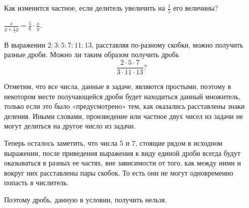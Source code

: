 
\begin{itemize}

	\itA Как изменится частное, если делитель увеличить на $\tfrac{1}{5}$ его величины?
	
	\itr $\frac{x}{y + \frac{1}{5}y} = \frac{5}{6} \cdot \frac{x}{y}$.
	
	\itB В выражении $2 : 3 : 5 : 7 : 11 : 13$, расставляя по-разному скобки, можно получить разные дроби. Можно ли таким образом получить дробь
	$$\frac{2 \cdot 5 \cdot 7}{3 \cdot 11 \cdot 13}?$$
	
	\itr Отметим, что все числа, данные в задаче, являются простыми, поэтому в некотором месте получающейся дроби будет находиться данный множитель, только если это было «предусмотрено» тем, как оказались расставлены знаки деления. Иными словами, произведение или частное двух чисел из задачи не могут делиться на другое число из задачи.
	
	Теперь осталось заметить, что числа 5 и 7, стоящие рядом в исходном выражении, после приведения выражения к виду единой дроби всегда будут оказываться в разных ее частях, вне зависимости от того, как между ними и вокруг них расставлены пары скобок. То есть они не могут одновременно попасть в числитель.
	
	Поэтому дробь, данную в условии, получить нельзя.
	
\end{itemize}